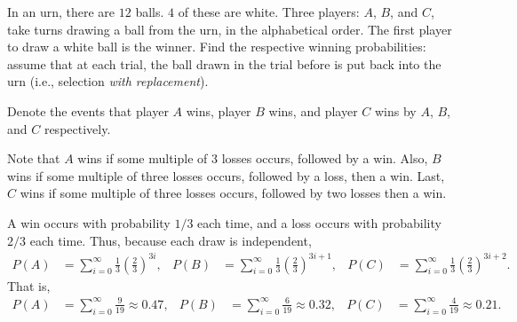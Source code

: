 \begin{problem}[Handout 5, \# 2]
  In an urn, there are \(12\) balls. \(4\) of these are white. Three
  players: \(A\), \(B\), and \(C\), take turns drawing a ball from the urn,
  in the alphabetical order. The first player to draw a white ball is the
  winner. Find the respective winning probabilities: assume that at each
  trial, the ball drawn in the trial before is put back into the urn (i.e.,
  selection \emph{with replacement}).
\end{problem}
\begin{solution}
  Denote the events that player $A$ wins, player $B$ wins, and player $C$
  wins by $A$, $B$, and $C$ respectively.

  Note that $A$ wins if some multiple of 3 losses occurs, followed by a
  win. Also, $B$ wins if some multiple of three losses occurs, followed by
  a loss, then a win. Last, $C$ wins if some multiple of three losses
  occurs, followed by two losses then a win.

  A win occurs with probability $1/3$ each time, and a loss occurs with
  probability $2/3$ each time. Thus, because each draw is independent,
  \begin{align*}
    P(A) &= \sum\limits_{i=0}^\infty \frac{1}{3} \left(\frac{2}{3}\right)^{3i}, &
    P(B) &= \sum\limits_{i=0}^\infty \frac{1}{3} \left(\frac{2}{3}\right)^{3i+1}, &
    P(C) &= \sum\limits_{i=0}^\infty \frac{1}{3} \left(\frac{2}{3}\right)^{3i+2}.
  \end{align*}
  That is,
  \begin{align*}
    P(A) &= \sum\limits_{i=0}^\infty \frac{9}{19} \approx 0.47,&
    P(B) &= \sum\limits_{i=0}^\infty \frac{6}{19} \approx 0.32,&
    P(C) &= \sum\limits_{i=0}^\infty \frac{4}{19} \approx 0.21.
  \end{align*}
\end{solution}
\newpage

